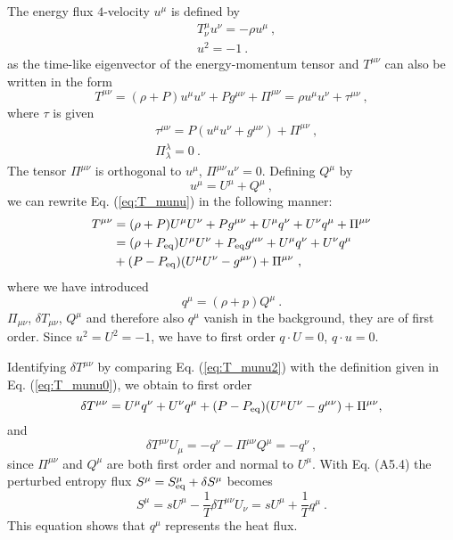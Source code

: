 \documentclass[11pt,a4paper]{article}
\begin{document}
The energy flux $4$-velocity $u^\mu$ is defined by
\begin{align}
& T_{\nu}^\mu u^\nu = -\rho u^\mu ~, \\
& u^2 = -1 ~.
\end{align}
as the time-like eigenvector of the energy-momentum tensor and $T^{\mu\nu}$ can also be written in the form
\begin{equation}
T^{\mu\nu} = (\rho +P) u^\mu u^\nu +P g^{\mu\nu} +\Pi^{\mu\nu} = \rho u^\mu u^\nu +\tau^{\mu\nu} ~,
\label{eq:T_munu}
\end{equation}
where $\tau$ is given
\begin{align}
& \tau^{\mu\nu} =P(u^\mu u^\nu+ g^{\mu\nu})+ \Pi^{\mu\nu} ~, \\
&  \Pi^\lambda_\lambda=0 ~.
\end{align}
The tensor $\Pi^{\mu\nu}$ is orthogonal to $u^\mu$,  $\Pi^{\mu\nu} u^\nu = 0$. Defining $Q^\mu$ by
\begin{equation}
u^\mu = U^\mu + Q^\mu ~, 
\end{equation}
we can rewrite Eq. (\ref{eq:T_munu}) in the following manner:
\begin{align}
\nonumber T^{\mu\nu} &= (\rho+P)U^\mu U^\nu+ Pg^{\mu\nu} + U^\mu q^\nu +U^\nu q^\mu+ \Pi^{\mu\nu} \\
\nonumber & =(\rho+P_{\rm eq}) U^\mu U^\nu +P_{\rm eq} g^{\mu\nu} +U^\mu q^\nu +U^\nu q^\mu \\
& +(P-P_{\rm eq})(U^\mu U^\nu -g^{\mu\nu})+ \Pi^{\mu\nu} ~,
\label{eq:T_munu2}
\end{align}
where we have introduced
\begin{equation}
q^\mu = (\rho + p)Q^\mu ~.
\end{equation}
$\Pi_{\mu\nu}$, $\delta T_{\mu\nu}$, $Q^\mu$ and therefore also $q^\mu$ vanish in the background, they are of first order. Since $u^2 = U^2 = -1$, we have to first order $q \cdot U = 0$, $q \cdot u = 0$.

Identifying $\delta T^{\mu\nu}$ by comparing Eq. (\ref{eq:T_munu2}) with the definition given in Eq. (\ref{eq:T_munu0}), we obtain to first order
\begin{equation}
\delta T^{\mu\nu} =U^\mu q^\nu +U^\nu q^\mu+(P-P_{\rm eq} )(U^\mu U^\nu -g^{\mu\nu})+ \Pi^{\mu\nu}, 
\end{equation}
and
\begin{equation}
\delta T^{\mu\nu} U_\mu = -q^\nu - \Pi^{\mu\nu} Q^\mu = -q^\nu ~,
\end{equation}
since $\Pi^{\mu\nu}$ and $Q^\mu$ are both first order and normal to $U^\mu$. With Eq. (A5.4) the perturbed entropy flux $S^\mu = S^\mu_{\rm eq} + \delta S^\mu$ becomes 
\begin{equation}
S^\mu =s U^\mu -  \dfrac{1}{T} \delta T^{\mu\nu} U_\nu = sU^\mu + \dfrac{1}{T} q^\mu ~.
\end{equation}
This equation shows that $q^\mu$ represents the heat flux.
\end{document}
